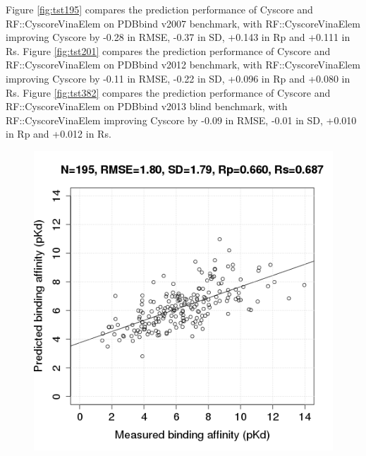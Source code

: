\documentclass[journal=jacsat,manuscript=article]{achemso}
\begin{document}
Figure \ref{fig:tst195} compares the prediction performance of Cyscore and RF::CyscoreVinaElem on PDBbind v2007 benchmark, with RF::CyscoreVinaElem improving Cyscore by -0.28 in RMSE, -0.37 in SD, +0.143 in Rp and +0.111 in Rs. Figure \ref{fig:tst201} compares the prediction performance of Cyscore and RF::CyscoreVinaElem on PDBbind v2012 benchmark, with RF::CyscoreVinaElem improving Cyscore by -0.11 in RMSE, -0.22 in SD, +0.096 in Rp and +0.080 in Rs. Figure \ref{fig:tst382} compares the prediction performance of Cyscore and RF::CyscoreVinaElem on PDBbind v2013 blind benchmark, with RF::CyscoreVinaElem improving Cyscore by -0.09 in RMSE, -0.01 in SD, +0.010 in Rp and +0.012 in Rs.

\begin{figure}[h]
\includegraphics[width=1.4\linewidth,natwidth=480,natheight=480]{../rfcyscore/x4/mlr/trn-247-tst-195-yp.png}
\endminipage
{}

\end{figure}
\end{document}
